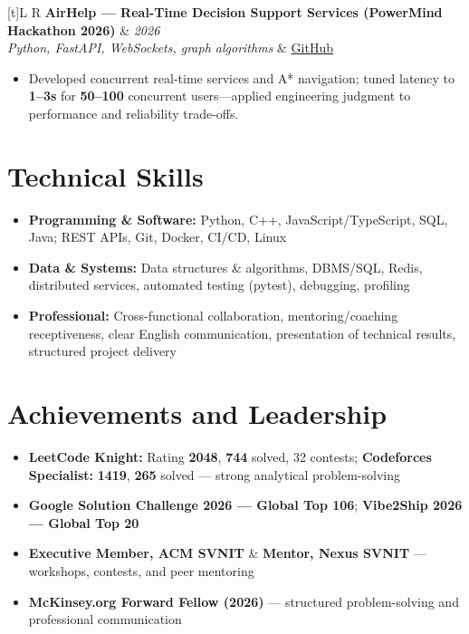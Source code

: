 \documentclass[a4paper,10pt]{article}
\newcommand{\resumeProject}[4]{%
  \vspace{0.4mm}
  \noindent
  \begin{tabularx}{\textwidth}[t]{L R}
    \textbf{#1} & \textit{#3} \\
    \textit{#2} & #4 \\
  \end{tabularx}
  \vspace{-0.4mm}%
}
\begin{document}
\resumeProject
  {AirHelp --- Real-Time Decision Support Services (PowerMind Hackathon 2026)}
  {Python, FastAPI, WebSockets, graph algorithms}
  {2026}
  {\href{https://github.com/Ojas-Srivastava05/AirHelp-AI-Airport-Assistant}{GitHub}}
\begin{itemize}
  \item Developed concurrent real-time services and A* navigation; tuned latency to \textbf{1--3s} for \textbf{50--100} concurrent users---applied engineering judgment to performance and reliability trade-offs.
\end{itemize}

\section{Technical Skills}
\small
\begin{itemize}[label={}]
  \item \textbf{Programming \& Software:} Python, C++, JavaScript/TypeScript, SQL, Java; REST APIs, Git, Docker, CI/CD, Linux
  \item \textbf{Data \& Systems:} Data structures \& algorithms, DBMS/SQL, Redis, distributed services, automated testing (pytest), debugging, profiling
  \item \textbf{Professional:} Cross-functional collaboration, mentoring/coaching receptiveness, clear English communication, presentation of technical results, structured project delivery
\end{itemize}

\section{Achievements and Leadership}
\small
\begin{itemize}
  \item \textbf{LeetCode Knight:} Rating \textbf{2048}, \textbf{744} solved, 32 contests; \textbf{Codeforces Specialist:} \textbf{1419}, \textbf{265} solved --- strong analytical problem-solving
  \item \textbf{Google Solution Challenge 2026 --- Global Top 106}; \textbf{Vibe2Ship 2026 --- Global Top 20}
  \item \textbf{Executive Member, ACM SVNIT} \& \textbf{Mentor, Nexus SVNIT} --- workshops, contests, and peer mentoring
  \item \textbf{McKinsey.org Forward Fellow (2026)} --- structured problem-solving and professional communication
\end{itemize}
\end{document}
